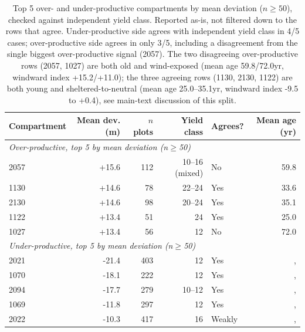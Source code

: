 \begin{table}[H]
\centering
\small
\begin{tabular}{lrrrlr}
\toprule
Compartment & Mean dev. (m) & $n$ plots & Yield class & Agrees? & Mean age (yr) \\
\midrule
\multicolumn{6}{l}{\textit{Over-productive, top 5 by mean deviation (n$\geq$50)}} \\
2057 & +15.6 & 112 & 10--16 (mixed) & No & 59.8 \\
1130 & +14.6 & 78 & 22--24 & Yes & 33.6 \\
2130 & +14.6 & 98 & 20--24 & Yes & 35.1 \\
1122 & +13.4 & 51 & 24 & Yes & 25.0 \\
1027 & +13.4 & 56 & 12 & No & 72.0 \\
\midrule
\multicolumn{6}{l}{\textit{Under-productive, top 5 by mean deviation (n$\geq$50)}} \\
2021 & -21.4 & 403 & 12 & Yes &, \\
1070 & -18.1 & 222 & 12 & Yes &, \\
2094 & -17.7 & 279 & 10--12 & Yes &, \\
1069 & -11.8 & 297 & 12 & Yes &, \\
2022 & -10.3 & 417 & 16 & Weakly &, \\
\bottomrule
\end{tabular}
\caption{\small{Top 5 over- and under-productive compartments by mean deviation
($n\geq50$), checked against independent yield class. Reported as-is, not filtered down to the
rows that agree. Under-productive side agrees with independent yield class in 4/5 cases;
over-productive side agrees in only 3/5, including a disagreement from the single biggest
over-productive signal (2057). The two disagreeing over-productive rows (2057, 1027) are both
old and wind-exposed (mean age 59.8/72.0yr, windward index +15.2/+11.0); the three agreeing
rows (1130, 2130, 1122) are both young and sheltered-to-neutral (mean age 25.0--35.1yr,
windward index -9.5 to +0.4), see main-text discussion of this split.}}
\label{tab:productivity-top5}
\end{table}

